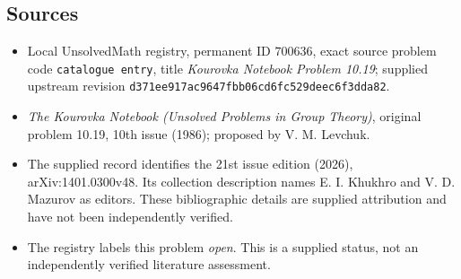 \documentclass[11pt]{article}
\begin{document}
\subsection{Sources}
\begin{itemize}
\item Local UnsolvedMath registry, permanent ID \(700636\), exact source problem code \texttt{catalogue entry}, title \emph{Kourovka Notebook Problem 10.19}; supplied upstream revision \texttt{d371ee917ac9647fbb06cd6fc529deec6f3dda82}.
\item \emph{The Kourovka Notebook (Unsolved Problems in Group Theory)}, original problem 10.19, 10th issue (1986); proposed by V. M. Levchuk.
\item The supplied record identifies the 21st issue edition (2026), arXiv:1401.0300v48. Its collection description names E. I. Khukhro and V. D. Mazurov as editors. These bibliographic details are supplied attribution and have not been independently verified.
\item The registry labels this problem \emph{open}. This is a supplied status, not an independently verified literature assessment.
\end{itemize}
\end{document}
